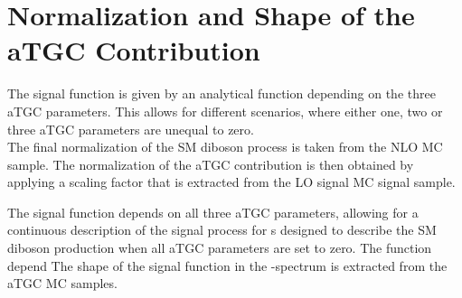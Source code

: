 \section{Normalization and Shape of the aTGC Contribution}
The signal function is given by an analytical function depending on the three aTGC parameters. This allows for different scenarios, where either one, two or three aTGC parameters are unequal to zero.\\
The final normalization of the SM diboson process is taken from the NLO MC sample. The normalization of the aTGC contribution is then obtained by applying a scaling factor that is extracted from the LO signal MC signal sample.



The signal function depends on all three aTGC parameters, allowing for a continuous description of the signal process for 
s designed to describe the SM diboson production when all aTGC parameters are set to zero. The function depend The shape of the signal function in the \MWV -spectrum is extracted from the aTGC MC samples. 




